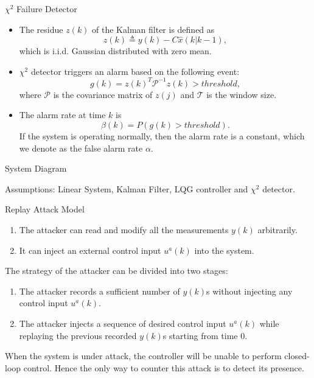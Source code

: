 \documentclass[10pt]{beamer}
\newcommand{\tikzdir}[1]{#1.tikz}
\newcommand{\inputtikz}[1]{}}
\begin{document}
  \begin{frame}{$\chi^2$ Failure Detector}
    \begin{itemize}
      \item The residue $z(k)$ of the Kalman filter is defined as
	\begin{displaymath}
	  z(k) \triangleq y(k) - C\hat x(k|k-1),
	\end{displaymath} 
	which is i.i.d. Gaussian distributed with zero mean. 
      \item $\chi^2$ detector triggers an alarm based on the following event:
	\begin{displaymath}
	  g(k)=  z(k)^T\mathcal P^{-1}z(k)> threshold,
	\end{displaymath}
	where $\mathcal P$ is the covariance matrix of $z(j)$ and $\mathcal T$ is the window size.
      \item The alarm rate at time $k$ is 
	\begin{displaymath}
	  \beta(k) = P(g(k) > threshold).
	\end{displaymath}
	If the system is operating normally, then the alarm rate is a constant, which we denote as the false alarm rate $\alpha$.
    \end{itemize}
  \end{frame}

  \begin{frame}{System Diagram}
    \begin{figure}[htpb]
      \begin{center}
	\inputtikz{systemdiagram}
      \end{center}
    \end{figure}
    Assumptions: Linear System, Kalman Filter, LQG controller and $\chi^2$ detector.
  \end{frame}

  \begin{frame}{Replay Attack Model}
    \begin{enumerate}
      \item The attacker can read and modify all the measurements $y(k)$ arbitrarily.
      \item It can inject an external control input $u^a(k)$ into the system. 
    \end{enumerate}
    The strategy of the attacker can be divided into two stages:
    \begin{enumerate}
      \item The attacker records a sufficient number of $y(k)$s without injecting any control input $u^a(k)$. 
      \item The attacker injects a sequence of desired control input $u^a(k)$ while replaying the previous recorded $y(k)$s starting from time $0$.
    \end{enumerate}
    When the system is under attack, the controller will be unable to perform closed-loop control. Hence the only way to counter this attack is to detect its presence. 
  \end{frame}
\end{document}
